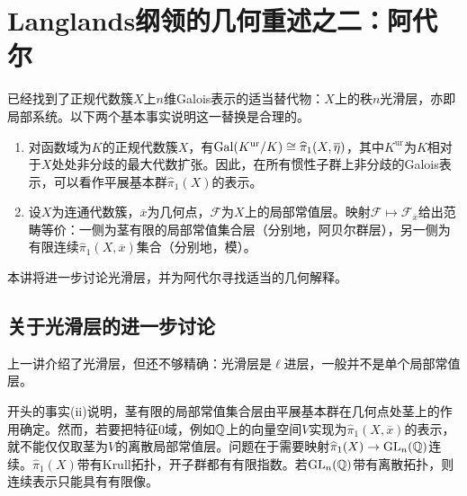 \chapter{Langlands纲领的几何重述之二：阿代尔}\label{L11}
已经找到了正规代数簇$X$上$n$维Galois表示的适当替代物：$X$上的秩$n$光滑层，亦即局部系统。以下两个基本事实说明这一替换是合理的。
\begin{enumerate}[label=(\roman*)]
\item 对函数域为$K$的正规代数簇$X$，有$\operatorname{Gal}(K^{\mathrm{ur}}/K)\cong\widehat\pi_1(X,\overline\eta)$，其中$K^{\mathrm{ur}}$为$K$相对于$X$处处非分歧的最大代数扩张。因此，在所有惯性子群上非分歧的Galois表示，可以看作平展基本群$\widehat\pi_1(X)$的表示。
\item 设$X$为连通代数簇，$\overline x$为几何点，$\mathcal F$为$X$上的局部常值层。映射$\mathcal F\mapsto\mathcal F_{\overline x}$给出范畴等价：一侧为茎有限的局部常值集合层（分别地，阿贝尔群层），另一侧为有限连续$\widehat\pi_1(X,\overline x)$集合（分别地，模）。
\end{enumerate}
本讲将进一步讨论光滑层，并为阿代尔寻找适当的几何解释。
\section{关于光滑层的进一步讨论}\label{L11S1}
上一讲介绍了光滑层，但还不够精确：光滑层是$\ell$进层，一般并不是单个局部常值层。

开头的事实(ii)说明，茎有限的局部常值集合层由平展基本群在几何点处茎上的作用确定。然而，若要把特征0域，例如$\mathbb{Q}$上的向量空间$V$实现为$\widehat\pi_1(X,\overline x)$的表示，就不能仅仅取茎为$V$的离散局部常值层。问题在于需要映射$\widehat\pi_1(X)\to\operatorname{GL}_n(\mathbb{Q})$连续。$\widehat\pi_1(X)$带有Krull拓扑，开子群都有有限指数。若$\operatorname{GL}_n(\mathbb{Q})$带有离散拓扑，则连续表示只能具有有限像。

